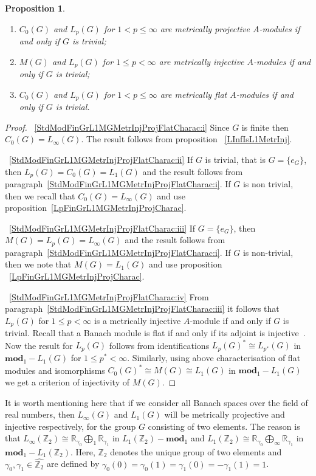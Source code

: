 \documentclass{article}
\theoremstyle{plain}
\newtheorem{proposition}{Proposition}[section]
\theoremstyle{definition}
\newtheorem{proof}{Proof}\def\theproof{}
\newcommand{\isom}{\mathop{\mathbin{\cong}}}
\begin{document}
\begin{fulltext}
\begin{proposition}
\begin{enumerate}[label = (\roman*)]
    \item $C_0(G)$ and $L_p(G)$ for $1<p\leq\infty$ are metrically projective
    $A$-modules if and only 
    if $G$ is trivial;\label{StdModFinGrL1MGMetrInjProjFlatCharac:ii}
 
    \item $M(G)$ and $L_p(G)$ for $1\leq p<\infty$ are metrically injective
    $A$-modules if and only 
    if $G$ is trivial;\label{StdModFinGrL1MGMetrInjProjFlatCharac:iii}
 
    \item $C_0(G)$ and $L_p(G)$ for $1<p\leq\infty$ are metrically flat
    $A$-modules if and only 
    if $G$ is trivial.\label{StdModFinGrL1MGMetrInjProjFlatCharac:iv}
\end{enumerate}
\end{proposition}
\begin{proof}
~\ref{StdModFinGrL1MGMetrInjProjFlatCharac:i} Since $G$ is finite then
$C_0(G)=L_\infty(G)$. The result follows from proposition
~\ref{LInfIsL1MetrInj}.

~\ref{StdModFinGrL1MGMetrInjProjFlatCharac:ii} If $G$ is trivial, that is
$G=\{e_G\}$, then $L_p(G)=C_0(G)=L_1(G)$ and the result follows from
paragraph~\ref{StdModFinGrL1MGMetrInjProjFlatCharac:i}. If $G$ is non trivial,
then we recall that $C_0(G)=L_\infty(G)$ and use
proposition~\ref{LpFinGrL1MGMetrInjProjCharac}.

~\ref{StdModFinGrL1MGMetrInjProjFlatCharac:iii} If $G=\{e_G\}$, then
$M(G)=L_p(G)=L_\infty(G)$ and the result follows from
paragraph~\ref{StdModFinGrL1MGMetrInjProjFlatCharac:i}. If $G$ is non-trivial,
then we note that $M(G)=L_1(G)$ and use proposition
~\ref{LpFinGrL1MGMetrInjProjCharac}.

~\ref{StdModFinGrL1MGMetrInjProjFlatCharac:iv} From
paragraph~\ref{StdModFinGrL1MGMetrInjProjFlatCharac:iii} it follows that
$L_p(G)$ for $1\leq p<\infty$ is a metrically injective $A$-module if and only
if $G$ is trivial. Recall that a Banach module is flat if and only if its
adjoint is injective~\cite[proposition 2.21]{NemGeomProjInjFlatBanMod}. Now the
result for $L_p(G)$ follows from identifications ${L_p(G)}^*\isom L_{p^*}(G)$ in
$\mathbf{mod}_1-L_1(G)$ for $1\leq p^*<\infty$. Similarly, using above
characterisation of flat modules and isomorphisms ${C_0(G)}^*\isom M(G)\isom
L_1(G)$ in $\mathbf{mod}_1-L_1(G)$ we get a criterion of injectivity of $M(G)$.
\end{proof}

It is worth mentioning here that if we consider all Banach spaces over the field
of real numbers, then $L_\infty(G)$ and $L_1(G)$ will be metrically projective
and injective respectively, for the group $G$ consisting of two elements. The
reason is that $L_\infty(\mathbb{Z}_2)\isom
\mathbb{R}_{\gamma_0}\bigoplus\nolimits_1\mathbb{R}_{\gamma_1}$ in
$L_1(\mathbb{Z}_2)-\mathbf{mod}_1$ and $L_1(\mathbb{Z}_2)\isom
\mathbb{R}_{\gamma_0}\bigoplus\nolimits_\infty\mathbb{R}_{\gamma_1}$ in
$\mathbf{mod}_1-L_1(\mathbb{Z}_2)$. Here, $\mathbb{Z}_2$ denotes the unique
group of two elements and $\gamma_0,\gamma_1\in\widehat{\mathbb{Z}_2}$ are
defined by $\gamma_0(0)=\gamma_0(1)=\gamma_1(0)=-\gamma_1(1)=1$.


\end{fulltext}
\end{document}
